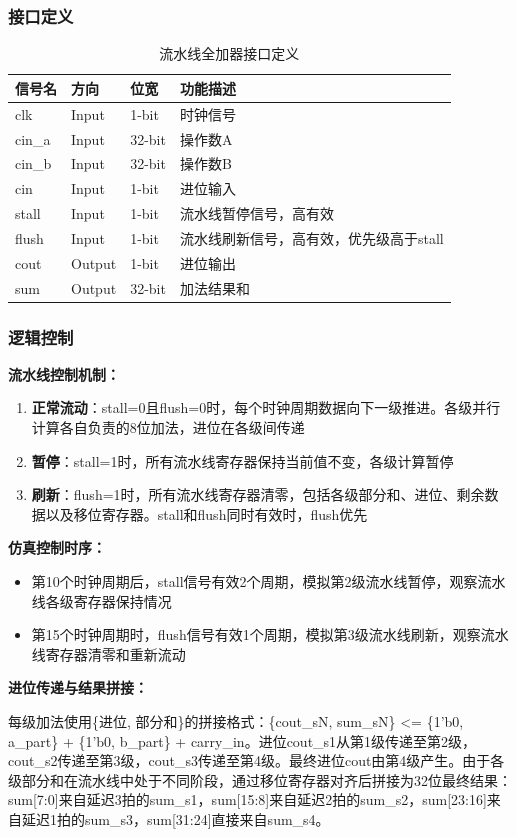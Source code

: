 \subsubsection{接口定义}

\begin{table}[htp]
\caption{流水线全加器接口定义}\label{tab:pipe_signal}
\begin{center}
    \begin{tabular}{|l|l|l|p{5cm}|}
    \hline
    \textbf{信号名} & \textbf{方向} & \textbf{位宽} & \textbf{功能描述}\\ \hline \hline
    clk    & Input  & 1-bit  & 时钟信号 \\
    cin\_a & Input  & 32-bit & 操作数A \\
    cin\_b & Input  & 32-bit & 操作数B \\
    cin    & Input  & 1-bit  & 进位输入 \\
    stall  & Input  & 1-bit  & 流水线暂停信号，高有效 \\
    flush  & Input  & 1-bit  & 流水线刷新信号，高有效，优先级高于stall \\
    cout   & Output & 1-bit  & 进位输出 \\
    sum    & Output & 32-bit & 加法结果和 \\
    \hline
    \end{tabular}
\end{center}
\end{table}

\subsubsection{逻辑控制}

\textbf{流水线控制机制：}

\begin{enumerate}
    \item \textbf{正常流动}：stall=0且flush=0时，每个时钟周期数据向下一级推进。各级并行计算各自负责的8位加法，进位在各级间传递
    \item \textbf{暂停}：stall=1时，所有流水线寄存器保持当前值不变，各级计算暂停
    \item \textbf{刷新}：flush=1时，所有流水线寄存器清零，包括各级部分和、进位、剩余数据以及移位寄存器。stall和flush同时有效时，flush优先
\end{enumerate}

\textbf{仿真控制时序：}
\begin{itemize}
    \item 第10个时钟周期后，stall信号有效2个周期，模拟第2级流水线暂停，观察流水线各级寄存器保持情况
    \item 第15个时钟周期时，flush信号有效1个周期，模拟第3级流水线刷新，观察流水线寄存器清零和重新流动
\end{itemize}

\textbf{进位传递与结果拼接：}

每级加法使用\{进位, 部分和\}的拼接格式：\{cout\_sN, sum\_sN\} <= \{1'b0, a\_part\} + \{1'b0, b\_part\} + carry\_in。进位cout\_s1从第1级传递至第2级，cout\_s2传递至第3级，cout\_s3传递至第4级。最终进位cout由第4级产生。由于各级部分和在流水线中处于不同阶段，通过移位寄存器对齐后拼接为32位最终结果：sum[7:0]来自延迟3拍的sum\_s1，sum[15:8]来自延迟2拍的sum\_s2，sum[23:16]来自延迟1拍的sum\_s3，sum[31:24]直接来自sum\_s4。
